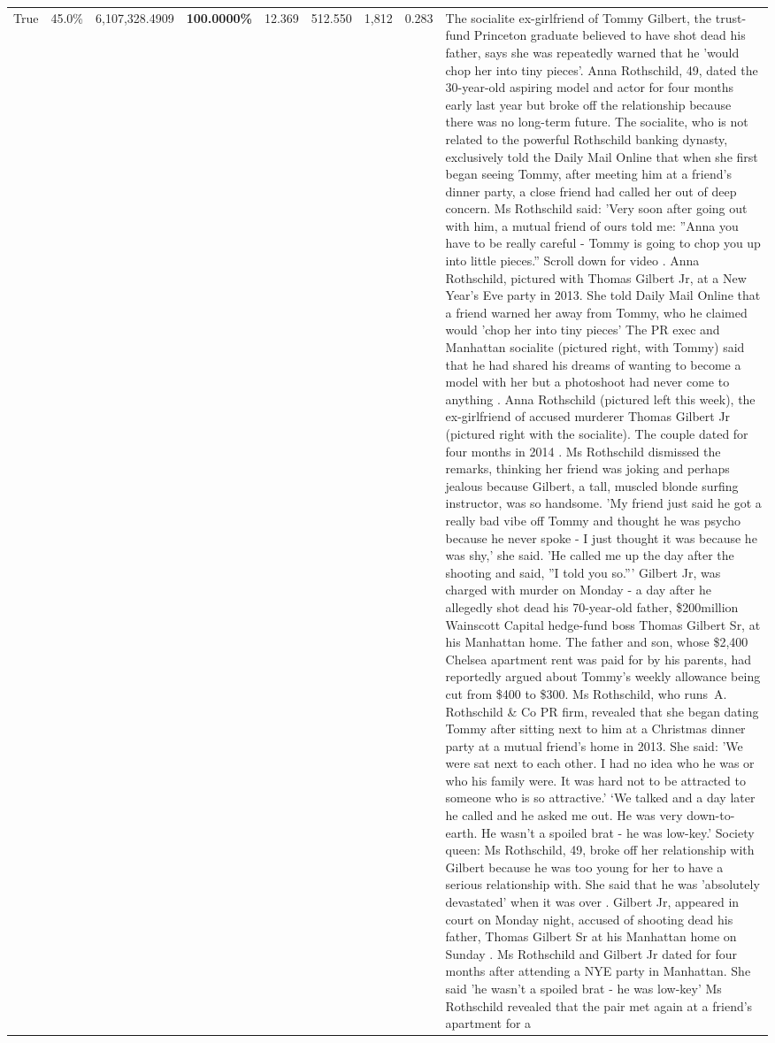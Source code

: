 \begin{table}[H]
\begin{tabular}{lllrlllll}
True & 45.0\% & 6,107,328.4909 & \bfseries \color{red} 100.0000\% & 12.369 & 512.550 & 1,812 & 0.283 & The socialite ex-girlfriend of Tommy Gilbert, the trust-fund Princeton graduate believed to have shot dead his father, says she was repeatedly warned that he 'would chop her into tiny pieces'. Anna Rothschild, 49, dated the 30-year-old aspiring model and actor for four months early last year but broke off the relationship because there was no long-term future. The socialite, who is not related to the powerful Rothschild banking dynasty, exclusively told the Daily Mail Online that when she first began seeing Tommy, after meeting him at a friend's dinner party, a close friend had called her out of deep concern. Ms Rothschild said: 'Very soon after going out with him, a mutual friend of ours told me: ''Anna you have to be really careful - Tommy is going to chop you up into little pieces.'' Scroll down for video . Anna Rothschild, pictured with Thomas Gilbert Jr, at a New Year's Eve party in 2013. She told Daily Mail Online that a friend warned her away from Tommy, who he claimed would 'chop her into tiny pieces' The PR exec and Manhattan socialite (pictured right, with Tommy) said that he had shared his dreams of wanting to become a model with her but a photoshoot had never come to anything . Anna Rothschild (pictured left this week), the ex-girlfriend of accused murderer Thomas Gilbert Jr (pictured right with the socialite). The couple dated for four months in 2014 . Ms Rothschild dismissed the remarks, thinking her friend was joking and perhaps jealous because Gilbert, a tall, muscled blonde surfing instructor, was so handsome. 'My friend just said he got a really bad vibe off Tommy and thought he was psycho because he never spoke - I just thought it was because he was shy,' she said. 'He called me up the day after the shooting and said, ''I told you so.''' Gilbert Jr, was charged with murder on Monday - a day after he allegedly shot dead his 70-year-old father, \$200million Wainscott Capital hedge-fund boss Thomas Gilbert Sr, at his Manhattan home. The father and son, whose \$2,400 Chelsea apartment rent was paid for by his parents, had reportedly argued about Tommy's weekly allowance being cut from \$400 to \$300. Ms Rothschild, who runs A. Rothschild \& Co PR firm, revealed that she began dating Tommy after sitting next to him at a Christmas dinner party at a mutual friend's home in 2013. She said: 'We were sat next to each other. I had no idea who he was or who his family were. It was hard not to be attracted to someone who is so attractive.' ‘We talked and a day later he called and he asked me out. He was very down-to-earth. He wasn’t a spoiled brat - he was low-key.’ Society queen: Ms Rothschild, 49, broke off her relationship with Gilbert because he was too young for her to have a serious relationship with. She said that he was 'absolutely devastated' when it was over . Gilbert Jr, appeared in court on Monday night, accused of shooting dead his father, Thomas Gilbert Sr at his Manhattan home on Sunday . Ms Rothschild and Gilbert Jr dated for four months after attending a NYE party in Manhattan. She said 'he wasn't a spoiled brat - he was low-key' Ms Rothschild revealed that the pair met again at a friend’s apartment for a 
\end{tabular}
\end{table}
